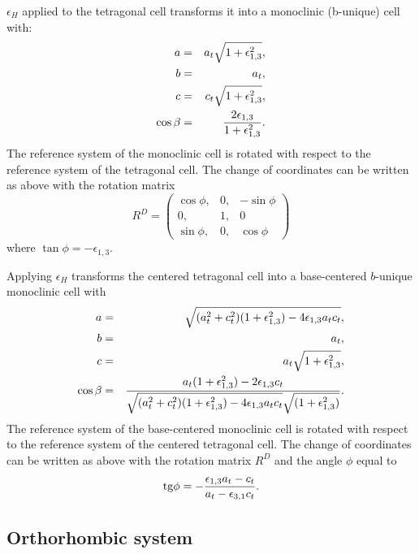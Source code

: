 \documentclass[12pt,a4paper,twoside]{report}
\begin{document}
$\epsilon_H$ applied to the tetragonal cell transforms it into a 
monoclinic (b-unique) cell with:
\begin{eqnarray}
a&=&a_t \sqrt{1+\epsilon_{1,3}^2}, \\
b&=&a_t, \\
c&=&c_t \sqrt{1+\epsilon_{1,3}^2}, \\
\cos\beta &=& {2 \epsilon_{1,3} \over 1 + \epsilon_{1,3}^2}.
\end{eqnarray}
The reference system of the monoclinic cell is rotated with respect to
the reference system of the tetragonal cell. 
The change of coordinates can be written as above with the rotation matrix 
\begin{equation}
R^D=\left( \begin{array}{ccc}
\cos\phi, & 0, & -\sin\phi \\
0, & 1, & 0 \\
\sin\phi, & 0, & \cos\phi  
\end{array}
\right)
\end{equation}
where $\tan \phi=-\epsilon_{1,3}$.

Applying $\epsilon_H$ transforms the centered tetragonal cell into 
a base-centered $b$-unique monoclinic cell with
\begin{eqnarray}
a&=&\sqrt{(a_t^2+c_t^2)(1+\epsilon_{1,3}^2)-4\epsilon_{1,3}a_tc_t}, \\
b&=&a_t, \\
c&=&a_t \sqrt{1+\epsilon_{1,3}^2}, \\
\cos\beta &=& {a_t (1+\epsilon_{1,3}^2) -2 \epsilon_{1,3} c_t \over 
\sqrt{(a_t^2+c_t^2)(1+\epsilon_{1,3}^2)-4\epsilon_{1,3}a_tc_t} 
\sqrt{(1+\epsilon_{1,3}^2)}}.
\end{eqnarray}
The reference system of the base-centered monoclinic cell is rotated with 
respect to the reference system of the centered tetragonal cell. 
The change of coordinates can be written as above with the rotation matrix 
$R^D$ and the angle $\phi$ equal to
\begin{equation}
{\rm tg} \phi = -{\epsilon_{1,3} a_t - c_t \over a_t - \epsilon_{3,1} c_t}.
\end{equation}

{\color{web-blue}\subsection{Orthorhombic system}}
\color{black}
\end{document}
